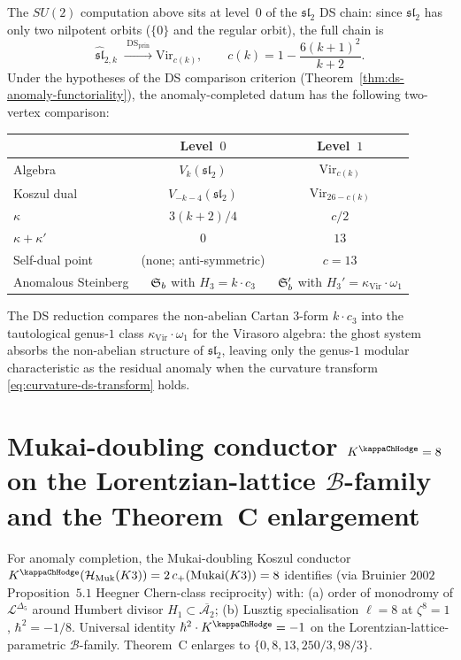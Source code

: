 \begin{remark}
\label{rem:su2-vs-sl3-chain}
The $SU(2)$ computation above sits at level~$0$ of the
$\mathfrak{sl}_2$ DS chain: since $\mathfrak{sl}_2$ has only two
nilpotent orbits ($\{0\}$ and the regular orbit), the full chain is
\[
\widehat{\mathfrak{sl}}_{2,k}
\;\xrightarrow{\;\mathrm{DS}_{\mathrm{prin}}\;}
\mathrm{Vir}_{c(k)},
\qquad
c(k) = 1-\frac{6(k+1)^2}{k+2}.
\]
Under the hypotheses of the DS comparison criterion
(Theorem~\ref{thm:ds-anomaly-functoriality}), the anomaly-completed
datum has the following two-vertex comparison:
\begin{center}
\renewcommand{\arraystretch}{1.2}
\begin{tabular}{lcc}
& \textbf{Level~$0$} & \textbf{Level~$1$} \\
\hline
Algebra & $V_k(\mathfrak{sl}_2)$ & $\mathrm{Vir}_{c(k)}$ \\[2pt]
Koszul dual & $V_{-k-4}(\mathfrak{sl}_2)$ & $\mathrm{Vir}_{26-c(k)}$ \\[2pt]
$\kappa$ & $3(k+2)/4$ & $c/2$ \\[2pt]
$\kappa+\kappa'$ & $0$ & $13$ \\[2pt]
Self-dual point & (none; anti-symmetric) & $c=13$ \\[2pt]
Anomalous Steinberg & $\mathfrak{S}_b$ with $H_3=k\cdot c_3$ & $\mathfrak{S}_b'$ with
 $H_3'=\kappa_{\mathrm{Vir}}\cdot\omega_1$
\end{tabular}
\end{center}
The DS reduction compares the non-abelian Cartan $3$-form
$k\cdot c_3$ into the tautological genus-$1$ class
$\kappa_{\mathrm{Vir}}\cdot\omega_1$ for the Virasoro algebra:
the ghost system absorbs the non-abelian structure of
$\mathfrak{sl}_2$, leaving only the genus-$1$ modular
characteristic as the residual anomaly when the curvature transform
\eqref{eq:curvature-ds-transform} holds.
\end{remark}

\section{Mukai-doubling conductor $K^{\kappaChHodge} = 8$
on the Lorentzian-lattice $\mathcal{B}$-family
and the Theorem~C enlargement}
\label{sec:ac-comparison-supplement}

\begin{remark}
\label{rem:ac-comparison-mukai-bruinier}
For anomaly completion, the Mukai-doubling Koszul conductor $K^{\kappaChHodge}(\mathcal{H}_{\mathrm{Muk}}(K3)) = 2\,c_+(\mathrm{Mukai}(K3)) = 8$ identifies (via Bruinier $2002$ Proposition~$5.1$ Heegner Chern-class reciprocity) with: (a) order of monodromy of $\mathcal{L}^{\Delta_5}$ around Humbert divisor $H_1 \subset \overline{\mathcal{A}_2}$; (b) Lusztig specialisation $\ell = 8$ at $\zeta^8 = 1$, $\hbar^2 = -1/8$. Universal identity $\hbar^2 \cdot K^{\kappaChHodge} = -1$ on the Lorentzian-lattice-parametric $\mathcal{B}$-family. Theorem~C enlarges to $\{0, 8, 13, 250/3, 98/3\}$.
\end{remark}
